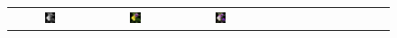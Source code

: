 \documentclass[10pt,twocolumn,letterpaper]{article}
\def\acollumsize{0.14\textwidth}
\begin{document}
\begin{figure}[t!]
\begin{center}
\begin{tabular}{ ccccccccccccc }
\includegraphics[width=\acollumsize]{img/result/3_in.JPEG}&
\includegraphics[width=\acollumsize]{img/result/3.png}&
\includegraphics[width=\acollumsize]{img/result/3_gt.JPEG}& &&



\end{tabular}
\end{center}
\end{figure}
\end{document}
